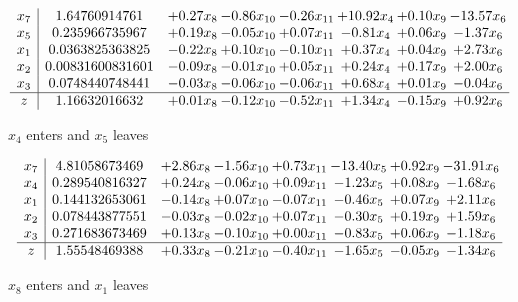 \documentclass[8pt]{article}
\begin{document}
 \[\begin{array}{c| c c@{\hskip 2pt} c@{\hskip 2pt} c@{\hskip 2pt} c@{\hskip 2pt} c@{\hskip 2pt} c@{\hskip 2pt} }
 x_{7}   &  1.64760914761 & +  0.27 x_{8} & -0.86 x_{10} & -0.26 x_{11} & + 10.92 x_{4} & +  0.10 x_{9} & -13.57 x_{6}\\
 x_{5}   &  0.235966735967 & +  0.19 x_{8} & -0.05 x_{10} & +  0.07 x_{11} & -0.81 x_{4} & +  0.06 x_{9} & -1.37 x_{6}\\
 x_{1}   &  0.0363825363825 & -0.22 x_{8} & +  0.10 x_{10} & -0.10 x_{11} & +  0.37 x_{4} & +  0.04 x_{9} & +  2.73 x_{6}\\
 x_{2}   &  0.00831600831601 & -0.09 x_{8} & -0.01 x_{10} & +  0.05 x_{11} & +  0.24 x_{4} & +  0.17 x_{9} & +  2.00 x_{6}\\
 x_{3}   &  0.0748440748441 & -0.03 x_{8} & -0.06 x_{10} & -0.06 x_{11} & +  0.68 x_{4} & +  0.01 x_{9} & -0.04 x_{6}\\
\hline
z    &  1.16632016632 & +  0.01 x_{8} & -0.12 x_{10} & -0.52 x_{11} & +  1.34 x_{4} & -0.15 x_{9} & +  0.92 x_{6}\\
\end{array}\]


 $ x_{4} $ enters and $ x_{5} $ leaves 

 \[\begin{array}{c| c c@{\hskip 2pt} c@{\hskip 2pt} c@{\hskip 2pt} c@{\hskip 2pt} c@{\hskip 2pt} c@{\hskip 2pt} }
 x_{7}   &  4.81058673469 & +  2.86 x_{8} & -1.56 x_{10} & +  0.73 x_{11} & -13.40 x_{5} & +  0.92 x_{9} & -31.91 x_{6}\\
 x_{4}   &  0.289540816327 & +  0.24 x_{8} & -0.06 x_{10} & +  0.09 x_{11} & -1.23 x_{5} & +  0.08 x_{9} & -1.68 x_{6}\\
 x_{1}   &  0.144132653061 & -0.14 x_{8} & +  0.07 x_{10} & -0.07 x_{11} & -0.46 x_{5} & +  0.07 x_{9} & +  2.11 x_{6}\\
 x_{2}   &  0.078443877551 & -0.03 x_{8} & -0.02 x_{10} & +  0.07 x_{11} & -0.30 x_{5} & +  0.19 x_{9} & +  1.59 x_{6}\\
 x_{3}   &  0.271683673469 & +  0.13 x_{8} & -0.10 x_{10} & +  0.00 x_{11} & -0.83 x_{5} & +  0.06 x_{9} & -1.18 x_{6}\\
\hline
z    &  1.55548469388 & +  0.33 x_{8} & -0.21 x_{10} & -0.40 x_{11} & -1.65 x_{5} & -0.05 x_{9} & -1.34 x_{6}\\
\end{array}\]


 $ x_{8} $ enters and $ x_{1} $ leaves 
\end{document}
